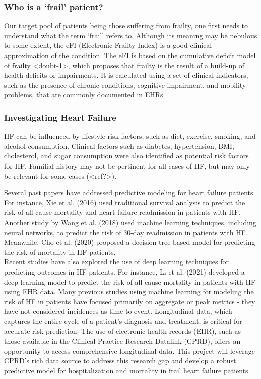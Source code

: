 \documentclass[%
 reprint,
 amsmath,amssymb,
 aps,
 nofootinbib
]{revtex4-2}
\theoremstyle{definition}
\begin{document}
\subsubsection{\label{frail}Who is a `frail' patient?}
Our target pool of patients being those suffering from frailty, one first needs to understand what the term `frail' refers to. Although its meaning may be nebulous to some extent, the eFI (Electronic Frailty Index) is a good clinical approximation of the condition. The eFI is based on the cumulative deficit model of frailty <doubt-1>, which proposes that frailty is the result of a build-up of health deficits or impairments. It is calculated using a set of clinical indicators, such as the presence of chronic conditions, cognitive impairment, and mobility problems, that are commonly documented in EHRs.
\subsubsection{\label{hf}Investigating Heart Failure}
HF can be influenced by lifestyle risk factors, such as diet, exercise, smoking, and alcohol consumption. Clinical factors such as diabetes, hypertension, BMI, cholesterol, and sugar consumption were also identified as potential risk factors for HF. Familial history may not be pertinent for all cases of HF, but may only be relevant for some cases (<ref?>).

Several past papers have addressed predictive modeling for heart failure patients. For instance, Xie et al. (2016) used traditional survival analysis to predict the risk of all-cause mortality and heart failure readmission in patients with HF. Another study by Wang et al. (2018) used machine learning techniques, including neural networks, to predict the risk of 30-day readmission in patients with HF. Meanwhile, Cho et al. (2020) proposed a decision tree-based model for predicting the risk of mortality in HF patients.\\

Recent studies have also explored the use of deep learning techniques for predicting outcomes in HF patients. For instance, Li et al. (2021) developed a deep learning model to predict the risk of all-cause mortality in patients with HF using EHR data. Many previous studies using machine learning for modeling the risk of HF in patients have focused primarily on aggregate or peak metrics - they have not considered incidences as time-to-event. Longitudinal data, which captures the entire cycle of a patient's diagnosis and treatment, is critical for accurate risk prediction. The use of electronic health records (EHR), such as those available in the Clinical Practice Research Datalink (CPRD), offers an opportunity to access comprehensive longitudinal data. This project will leverage CPRD's rich data source to address this research gap and develop a robust predictive model for hospitalization and mortality in frail heart failure patients.\\
\end{document}
